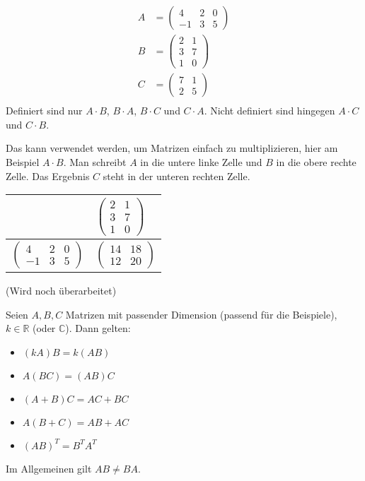 \begin{align*}
    A &= \begin{pmatrix}
        4 & 2 & 0 \\
        -1 & 3 & 5
    \end{pmatrix} \\
    B &= \begin{pmatrix}
        2 & 1 \\
        3 & 7 \\
        1 & 0
    \end{pmatrix} \\
    C &= \begin{pmatrix}
        7 & 1 \\
        2 & 5
    \end{pmatrix} \\
\end{align*}
Definiert sind nur $A\cdot B$, $B\cdot A$, $B\cdot C$ und $C\cdot A$. Nicht definiert sind hingegen $A\cdot C$ und $C\cdot B$.

Das  kann verwendet werden, um Matrizen einfach zu multiplizieren, hier am Beispiel $A\cdot B$. Man schreibt $A$ in die untere linke Zelle und $B$ in die obere rechte Zelle. Das Ergebnis $C$ steht in der unteren rechten Zelle.
\begin{center}
\begin{tabular}{r|l}
    & $\begin{pmatrix}2 & 1\\3 & 7\\1 & 0\end{pmatrix}$ \\ \hline
    $\begin{pmatrix}4 & 2 & 0\\-1 & 3 & 5\end{pmatrix}$ & $\begin{pmatrix} 14 & 18 \\ 12 & 20 \end{pmatrix}$
\end{tabular}
\end{center}
(Wird noch überarbeitet)

Seien $A, B, C$ Matrizen mit passender Dimension (passend für die Beispiele), $k \in \mathbb{R}$ (oder $\mathbb{C}$). Dann gelten:
\begin{itemize}
    \item{$(kA)B = k(AB)$}
    \item{$A(BC) = (AB)C$}
    \item{$(A+B)C = AC+BC$}
    \item{$A(B+C) = AB+AC$}
    \item{$(AB)^T = B^TA^T$}
\end{itemize}
Im Allgemeinen gilt $AB \neq BA$.


